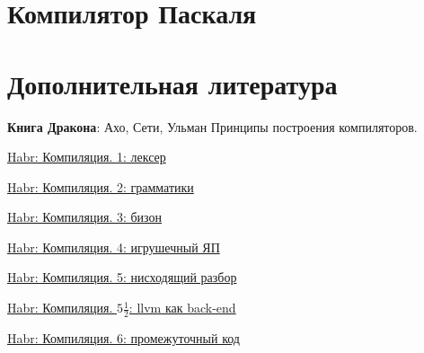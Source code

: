 
\section{Компилятор Паскаля}

\section{Дополнительная литература}\label{lexlit}

\label{exdragon}\cite{dragonbook} \textbf{Книга Дракона}: Ахо, Сети, Ульман
Принципы построения компиляторов.

\bigskip

\href{http://habrahabr.ru/post/99162/}{Habr: Компиляция. 1: лексер}

\href{http://habrahabr.ru/post/99298/}{Habr: Компиляция. 2: грамматики}

\href{http://habrahabr.ru/post/99366/}{Habr: Компиляция. 3: бизон}

\href{http://habrahabr.ru/post/99397/}{Habr: Компиляция. 4: игрушечный ЯП}

\href{http://habrahabr.ru/post/99466/}{Habr: Компиляция. 5: нисходящий разбор}

\href{http://habrahabr.ru/post/102597/}{Habr: Компиляция. $5\frac{1}{2}$: llvm
как back-end}

\href{http://habrahabr.ru/post/99592/}{Habr: Компиляция. 6: промежуточный код}

